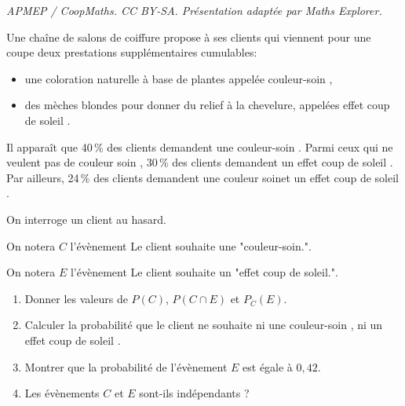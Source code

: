 \documentclass[10pt]{article}
\begin{document}
\noindent\textit{APMEP / CoopMaths. CC BY-SA. Présentation adaptée par Maths Explorer.}\par\medskip
\medskip

Une chaîne de salons de coiffure propose à ses clients qui viennent pour une coupe deux prestations supplémentaires cumulables:
\begin{itemize}
\item une coloration naturelle à base de plantes appelée \og couleur-soin \fg,
\item des mèches blondes pour donner du relief à la chevelure, appelées \og effet coup de soleil \fg.
\end{itemize}

\smallskip

Il apparaît que 40\,\% des clients demandent une \og couleur-soin \fg. Parmi ceux qui ne veulent pas de \og couleur soin \fg, 30\,\% des clients demandent un \og effet coup de soleil \fg. Par ailleurs, 24\,\% des clients demandent une \og couleur soin\fg et un \og effet coup de soleil \fg.

On interroge un client au hasard.

On notera $C$ l'évènement \og Le client souhaite une "couleur-soin."\fg.

On notera $E$ l'évènement \og Le client souhaite un "effet coup de soleil."\fg.

\medskip

\begin{enumerate}
\item Donner les valeurs de $P(C)$, $P( C \cap E)$ et $P_{\overline{C}}(E)$.
\item Calculer la probabilité que le client ne souhaite ni une \og couleur-soin \fg, ni un \og
effet coup de soleil \fg.
\item Montrer que la probabilité de l'évènement $E$ est égale à $0,42$.
\item Les évènements $C$ et $E$ sont-ils indépendants ?
\end{enumerate}

\bigskip
\end{document}
